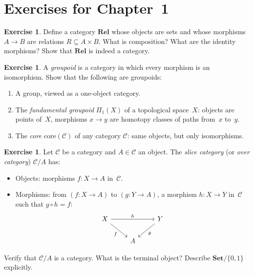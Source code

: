 \documentclass[a4paper,12pt]{book}
\newcommand{\Set}{\mathbf{Set}}
\theoremstyle{definition}
\newtheorem{exercise}[definition]{Exercise}
\theoremstyle{plain}
\theoremstyle{remark}
\begin{document}
\section{Exercises for Chapter~1}\label{sec:exercises-ch1}

\begin{exercise}\label{exo:cat-rels}
Define a category $\mathbf{Rel}$ whose objects are sets and whose
morphisms $A\to B$ are relations $R\subseteq A\times B$.
What is composition?  What are the identity morphisms?
Show that $\mathbf{Rel}$ is indeed a category.
\end{exercise}

\begin{exercise}\label{exo:groupoid}
A \emph{groupoid} is a category in which every morphism is an
isomorphism.  Show that the following are groupoids:
\begin{enumerate}[label=(\roman*)]
    \item A group, viewed as a one-object category.
    \item The \emph{fundamental groupoid} $\Pi_1(X)$ of a topological
          space~$X$: objects are points of~$X$, morphisms $x\to y$
          are homotopy classes of paths from~$x$ to~$y$.
    \item The \emph{core} $\mathrm{core}(\mathcal{C})$ of any category
          $\mathcal{C}$: same objects, but only isomorphisms.
\end{enumerate}
\end{exercise}

\begin{exercise}\label{exo:slice-category}
Let $\mathcal{C}$ be a category and $A\in\mathcal{C}$ an object.
The \emph{slice category} (or \emph{over category}) $\mathcal{C}/A$
has:
\begin{itemize}
    \item Objects: morphisms $f\colon X\to A$ in~$\mathcal{C}$.
    \item Morphisms: from $(f\colon X\to A)$ to $(g\colon Y\to A)$,
          a morphism $h\colon X\to Y$ in~$\mathcal{C}$ such that
          $g\circ h = f$:
\[
\begin{tikzcd}
    X \arrow[rr, "h"] \arrow[dr, "f"'] && Y \arrow[dl, "g"] \\
    & A &
\end{tikzcd}
\]
\end{itemize}
Verify that $\mathcal{C}/A$ is a category.  What is the terminal object?
Describe $\Set/\{0,1\}$ explicitly.
\end{exercise}
\end{document}

